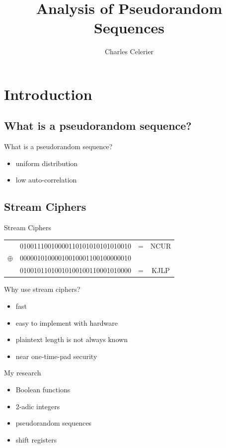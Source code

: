\documentclass{beamer}
\begin{document}
\title{Analysis of Pseudorandom Sequences}
\author{Charles Celerier}
\frame{\titlepage}
\frame{\tableofcontents}

\section{Introduction}
\subsection{What is a pseudorandom sequence?}
\begin{frame}{What is a pseudorandom sequence?}
  \begin{itemize}
    \item uniform distribution
    \item low auto-correlation
  \end{itemize}
\end{frame}

\subsection{Stream Ciphers}
\begin{frame}{Stream Ciphers}
  \begin{tabular}{c c c c}
              & 01001110010000110101010101010010 & = & NCUR\\
              \pause
     $\oplus$ & 00000101000010010001100100000010 & \\
              \hline 
              \pause
              & 01001011010010100100110001010000 & = & KJLP
  \end{tabular}
\end{frame}

\begin{frame}{Why use stream ciphers?}
  \begin{itemize}
    \item fast
    \item easy to implement with hardware
    \item plaintext length is not always known
    \item near one-time-pad security
  \end{itemize}
\end{frame}

\begin{frame}{My research}
  \begin{itemize}
    \item Boolean functions
    \item 2-adic integers
    \item pseudorandom sequences
    \item shift registers
  \end{itemize}
\end{frame}
\end{document}
